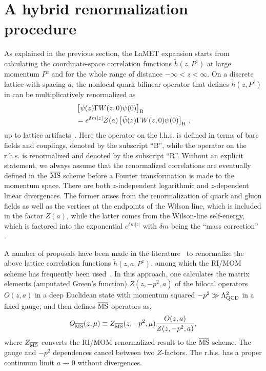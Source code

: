 \section{A hybrid renormalization procedure}
\label{sec:hybrid}

As explained in the previous section,
the LaMET expansion starts from calculating the coordinate-space
correlation functions $\tilde h(z,P^z)$ at large momentum $P^z$ and for the whole range
of distance $-\infty<z<\infty$.
On a discrete
lattice with spacing $a$, the nonlocal quark bilinear operator that defines $\tilde h(z,P^z)$ in  can be multiplicatively renormalized as~\cite{Ji:2017oey,Ishikawa:2017faj,Green:2017xeu}
\begin{align}\label{eq:ren}
&\left[\bar{\psi}(z)\Gamma W(z,0)\psi(0)\right]_{\rm B} \nonumber\\
&= e^{\delta m|z|}Z(a) \left[\bar{\psi}(z)\Gamma W(z,0)\psi(0)\right]_{\rm R}\,,
\end{align}
up to lattice artifacts~\cite{Constantinou:2017sej,Chen:2017mie}. Here the operator on the l.h.s. is defined in terms of bare fields and couplings, denoted by the subscript ``B'', while the operator on the r.h.s. is renormalized and denoted by the subscript ``R''. Without an explicit
statement, we always assume that the renormalized correlations are eventually defined in the ${\overline{\rm MS}}$ scheme before a Fourier transformation is made to the momentum space.
There are both $z$-independent
logarithmic and $z$-dependent linear divergences.
The former arises from the renormalization
of quark and gluon fields as well as the vertices at the endpoints of the Wilson line, which is included in the factor $Z(a)$, while
the latter comes from the Wilson-line self-energy, which is factored into the exponential $e^{\delta m|z|}$ with $\delta m$ being the ``mass correction'' .

A number of
proposals have been made in the literature~\cite{Ishikawa:2016znu,Chen:2016fxx,Monahan:2016bvm,Radyushkin:2017cyf,Constantinou:2017sej,Green:2017xeu,Stewart:2017tvs,Braun:2018brg,Li:2020xml} to renormalize the above lattice correlation functions $\tilde h(z, a, P^z)$, among which the RI/MOM scheme has frequently
been used~\cite{Constantinou:2017sej,Stewart:2017tvs}. In this approach,
one calculates the matrix elements (amputated Green's function) $Z(z,-p^2,a)$ of the bilocal operators $O(z,a)$ in a deep Euclidean state with momentum squared $-p^2\gg\Lambda_{\rm QCD}^2$ in a
fixed gauge, and then defines $\overline{\rm MS}$ operators
as,
\begin{align}
             O_{\overline{\rm MS}}(z,\mu) \equiv Z_{\overline{\rm MS}}(z,-p^2,\mu)\frac{O(z,a)}{Z(z,-p^2,a)},
\end{align}
where $Z_{\overline{\rm MS}}$ converts the RI/MOM renormalized result to the $\overline{\rm MS}$ scheme. The gauge and $-p^2$ dependences cancel between two $Z$-factors.
The r.h.s. has a proper continuum limit $a\to 0$ without divergences.

